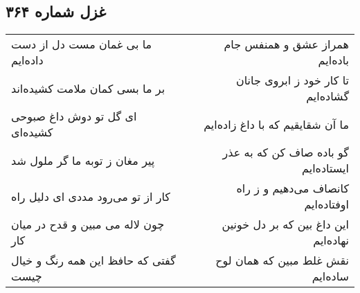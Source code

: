 \begin{center}
\section*{غزل شماره ۳۶۴}
\label{sec:sh364}
\begin{longtable}{l p{0.5cm} r}
ما بی غمان مست دل از دست داده‌ایم
&&
همراز عشق و همنفس جام باده‌ایم
\\
بر ما بسی کمان ملامت کشیده‌اند
&&
تا کار خود ز ابروی جانان گشاده‌ایم
\\
ای گل تو دوش داغ صبوحی کشیده‌ای
&&
ما آن شقایقیم که با داغ زاده‌ایم
\\
پیر مغان ز توبه ما گر ملول شد
&&
گو باده صاف کن که به عذر ایستاده‌ایم
\\
کار از تو می‌رود مددی ای دلیل راه
&&
کانصاف می‌دهیم و ز راه اوفتاده‌ایم
\\
چون لاله می مبین و قدح در میان کار
&&
این داغ بین که بر دل خونین نهاده‌ایم
\\
گفتی که حافظ این همه رنگ و خیال چیست
&&
نقش غلط مبین که همان لوح ساده‌ایم
\\
\end{longtable}
\end{center}
